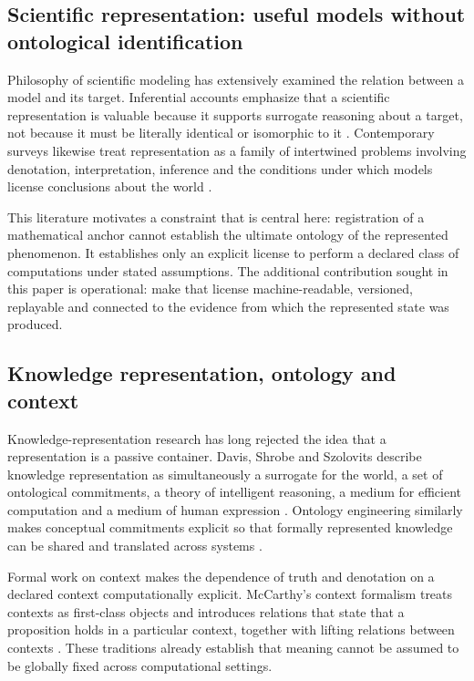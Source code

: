 \documentclass[11pt,a4paper]{article}
\begin{document}
\subsection{Scientific representation: useful models without ontological identification}
Philosophy of scientific modeling has extensively examined the relation between a model and its target. Inferential accounts emphasize that a scientific representation is valuable because it supports surrogate reasoning about a target, not because it must be literally identical or isomorphic to it \cite{suarez2004}. Contemporary surveys likewise treat representation as a family of intertwined problems involving denotation, interpretation, inference and the conditions under which models license conclusions about the world \cite{friggNguyen2020}.

This literature motivates a constraint that is central here: registration of a mathematical anchor cannot establish the ultimate ontology of the represented phenomenon. It establishes only an explicit license to perform a declared class of computations under stated assumptions. The additional contribution sought in this paper is operational: make that license machine-readable, versioned, replayable and connected to the evidence from which the represented state was produced.

\subsection{Knowledge representation, ontology and context}
Knowledge-representation research has long rejected the idea that a representation is a passive container. Davis, Shrobe and Szolovits describe knowledge representation as simultaneously a surrogate for the world, a set of ontological commitments, a theory of intelligent reasoning, a medium for efficient computation and a medium of human expression \cite{davis1993}. Ontology engineering similarly makes conceptual commitments explicit so that formally represented knowledge can be shared and translated across systems \cite{gruber1993,guarino1998}.

Formal work on context makes the dependence of truth and denotation on a declared context computationally explicit. McCarthy's context formalism treats contexts as first-class objects and introduces relations that state that a proposition holds in a particular context, together with lifting relations between contexts \cite{mccarthy1993}. These traditions already establish that meaning cannot be assumed to be globally fixed across computational settings.
\end{document}
